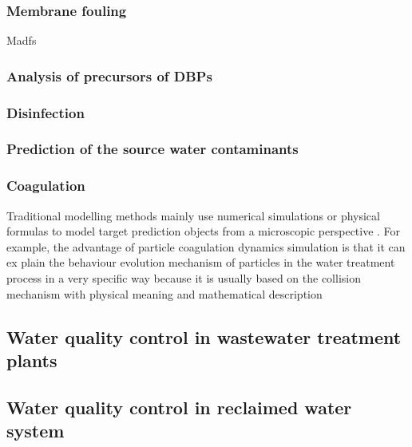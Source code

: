 \subsubsection{Membrane fouling}
Madfs
\subsubsection{Analysis of precursors of DBPs}

\subsubsection{Disinfection}
\subsubsection{Prediction of the source water contaminants}
\subsubsection{Coagulation}
Traditional modelling methods 
mainly use numerical simulations or physical formulas to model target prediction objects from 
a microscopic perspective . For example, the advantage of particle coagulation dynamics 
simulation is that it can ex    plain the behaviour evolution mechanism of particles in the water 
treatment process in a very specific way because it is usually based on the collision mechanism 
with physical meaning and mathematical description

\subsection{Water quality control in wastewater treatment plants}
\subsection{Water quality control in reclaimed water system}

